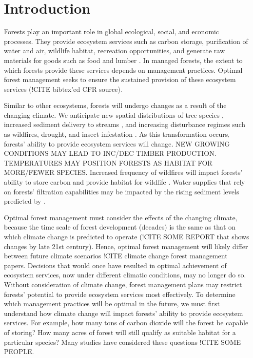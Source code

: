 
\section{Introduction}
 
Forests play an important role in global ecological, social, and economic processes. They provide ecosystem services such as carbon storage, purification of water and air, wildlife habitat, recreation opportunities, and generate raw materials for goods such as food and lumber \cite{daily1997ecosystem}. In managed forests, the extent to which forests provide these services depends on management practices. Optimal forest management seeks to ensure the sustained provision of these ecosystem services (!CITE bibtex'ed CFR source).

Similar to other ecosystems, forests will undergo changes as a result of the changing climate. We anticipate new spatial distributions of tree species \cite{iverson1998predicting}, increased sediment delivery to streams \cite{Goode20121}, and increasing disturbance regimes such as wildfires, drought, and insect infestation \cite{vose2012effects}. As this transformation occurs, forests’ ability to provide ecosystem services will change. NEW GROWING CONDITIONS MAY LEAD TO INC/DEC TIMBER PRODUCTION. TEMPERATURES MAY POSITION FORESTS AS HABITAT FOR MORE/FEWER SPECIES. Increased frequency of wildfires will impact forests’ ability to store carbon \cite{bonan2008forests} and provide habitat for wildlife \cite{mckenzie2004climatic}. Water supplies that rely on forests’ filtration capabilities may be impacted by the rising sediment levels predicted by \cite{Goode20121}.

Optimal forest management must consider the effects of the changing climate, because the time scale of forest development (decades) is the same as that on which climate change is predicted to operate (!CITE SOME REPORT that shows changes by late 21st century). Hence, optimal forest management will likely differ between future climate scenarios !CITE climate change forest management papers. Decisions that would once have resulted in optimal achievement of ecosystem services, now under different climatic conditions, may no longer do so. Without consideration of climate change, forest management plans may restrict forests' potential to provide ecosystem services most effectively. To determine which management practices will be optimal in the future, we must first understand how climate change will impact forests' ability to provide ecosystem services. For example, how many tons of carbon dioxide will the forest be capable of storing? How many acres of forest will still qualify as suitable habitat for a particular species? Many studies have considered these questions !CITE SOME PEOPLE.

